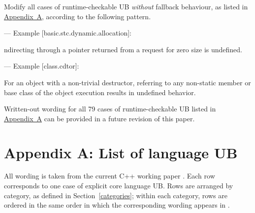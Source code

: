 Modify all cases of runtime-checkable UB \emph{without} fallback behaviour, as listed in \hyperref[appendix]{Appendix~A}, according to the following pattern. 

--- Example [basic.stc.dynamic.allocation]:

\begin{adjustwidth}{0.5cm}{0.5cm}
ndirecting through a pointer  returned from a request for zero size is undefined.
\end{adjustwidth}

--- Example [class.cdtor]:

\begin{adjustwidth}{0.5cm}{0.5cm}
For an object with a non-trivial destructor, referring to any non-static member or base class of the object  execution results in undefined behavior.
\end{adjustwidth}

Written-out wording for all 79 cases of runtime-checkable UB listed in \hyperref[appendix]{Appendix~A} can be provided in a future revision of this paper.

\section*{Appendix A: List of language UB}
\label{appendix}

All wording is taken from the current C++ working paper \cite{N5008}. Each row corresponds to one case of explicit core language UB. Rows are arranged by category, as defined in Section~\ref{categories}; within each category, rows are ordered in the same order in which the corresponding wording appears in \cite{N5008}.


